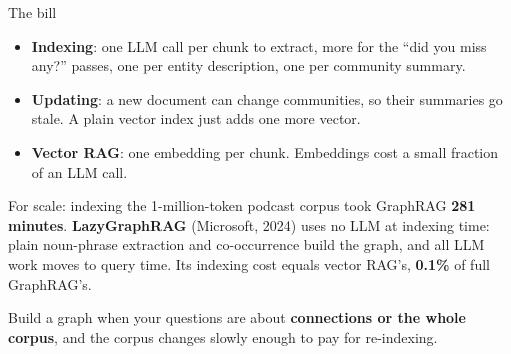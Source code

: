 \documentclass[aspectratio=169]{beamer}
\newcommand{\takebox}[1]{%
  \begin{tcolorbox}[colback=paramgreen!8, colframe=paramgreen, boxrule=0.6pt, arc=2pt]
  #1
  \end{tcolorbox}}
\begin{document}
\begin{frame}{The bill}
  \vspace{0.2em}
  \begin{itemize}
    \item \textbf{Indexing}: one LLM call per chunk to extract, more for the ``did you miss any?''
      passes, one per entity description, one per community summary.
    \item \textbf{Updating}: a new document can change communities, so their summaries go stale.
      A plain vector index just adds one more vector.
    \item \textbf{Vector RAG}: one embedding per chunk. Embeddings cost a small fraction of an LLM
      call.
  \end{itemize}

  \vspace{0.3em}
  {\small For scale: indexing the 1-million-token podcast corpus took GraphRAG \textbf{281 minutes}.
  \textbf{LazyGraphRAG} (Microsoft, 2024) uses no LLM at indexing time: plain noun-phrase
  extraction and co-occurrence build the graph, and all LLM work moves to query time. Its
  indexing cost equals vector RAG's, \textbf{0.1\%} of full GraphRAG's.}

  \vspace{0.3em}
  \takebox{\small Build a graph when your questions are about \textbf{connections or the whole
  corpus}, and the corpus changes slowly enough to pay for re-indexing.}
\end{frame}
\end{document}
